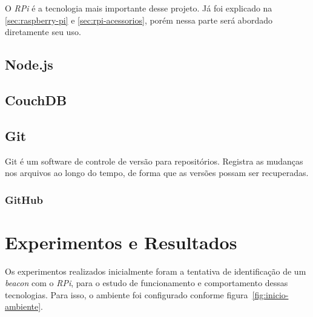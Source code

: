 \documentclass[
		12pt,				%
		openright,			%
		oneside,			%
		a4paper,			%
		chapter=TITLE,		%
		english,			%
		brazil				%
	]{abntex2}
\begin{document}
O \textit{RPi} é a tecnologia mais importante desse projeto. Já foi explicado na \autoref{sec:raspberry-pi} e \autoref{sec:rpi-acessorios}, porém nessa parte será abordado diretamente seu uso.



\section{Node.js}\label{sec:node-js}



\section{CouchDB}\label{sec:couchdb}



\section{Git}\label{sec:git}

Git é um software de controle de versão para repositórios. Registra as mudanças nos arquivos ao longo do tempo, de forma que as versões possam ser recuperadas. \cite{pro-git}

\subsection{GitHub}\label{sec:github}





\chapter{Experimentos e Resultados}\label{cap:experimentos-resultados}

Os experimentos realizados inicialmente foram a tentativa de identificação de um \textit{beacon} com o \textit{RPi}, para o estudo de funcionamento e comportamento dessas tecnologias. Para isso, o ambiente foi configurado conforme figura~\ref{fig:inicio-ambiente}. 
\end{document}

